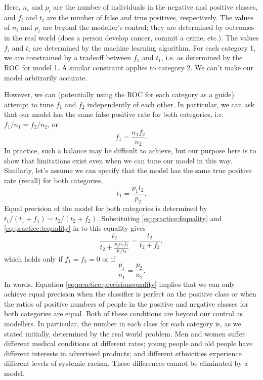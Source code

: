 \pagebreak
Here, $n_i$ and $p_i$ are the number of individuals in the negative and positive classes, and $f_i$ and $t_i$ are the number of false and true positives, respectively. The values of $n_i$ and $p_i$ are beyond the modeller's control; they are determined by outcomes in the real world (does a person develop cancer, commit a crime, etc.). The values $f_i$ and $t_i$ are determined by the machine learning algorithm. For each category 1, we are constrained by a tradeoff between $f_1$ and $t_1$, i.e. as determined by the ROC for model 1. A similar constraint applies to category 2. We can't make our model arbitrarily accurate.

However, we can (potentially using the ROC for each category as a guide) attempt to tune $f_1$ and $f_2$ independently of each other.
In particular, we can ask that our model has the same false positive rate for both categories, i.e. $f_1/n_1=f_2/n_2$, or
\begin{equation}
f_1 = \frac{n_1 f_2}{n_2}. \label{eq:practice:fequality}
\end{equation}
In practice, such a balance may be difficult to achieve, but our purpose here is to show that limitations exist even when we can tune our model in this way. Similarly, let's assume we can specify that the model has the same true positive rate (recall) for both categories,
\begin{equation}
t_1= \frac{p_1 t_2}{p_2}. \label{eq:practice:tequality}
\end{equation}
Equal precision of the model for both categories is determined by $t_1/(t_1+f_1)=t_2/(t_2+f_2)$. Substituting \eqref{eq:practice:fequality} and \eqref{eq:practice:tequality} in to this equality gives
\[
\frac{ t_2}{t_2+ \frac{p_2 n_1 f_2}{p_1 n_2}}=\frac{t_2}{t_2+f_2},
\]
which holds only if $f_1=f_2=0$ or if
\begin{equation}
\frac{p_1}{n_1}=\frac{p_2}{n_2}. \label{eq:practice:precisionequality}
\end{equation}
In words, Equation \eqref{eq:practice:precisionequality} implies that we can only achieve equal precision when the classifier is perfect on the positive class or when the ratios of positive numbers of people in the positive and negative classes for both categories are equal. Both of these conditions are beyond our control as modellers. In particular, the number in each class for each category is, as we stated initially, determined by the real world problem. Men and women suffer different medical conditions at different rates; young people and old people have different interests in advertised products; and different ethnicities experience different levels of systemic racism.  These differences cannot be eliminated by a model.

